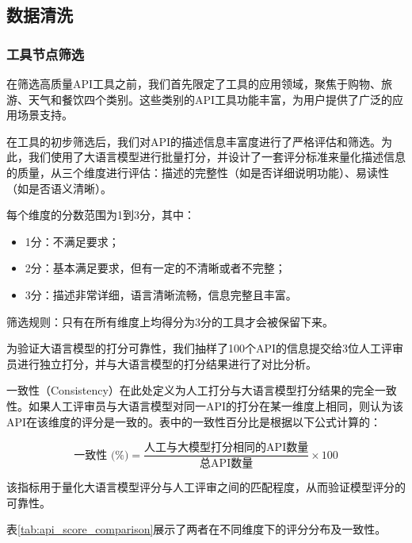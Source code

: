 \subsection{数据清洗}

\subsubsection{工具节点筛选}

在筛选高质量API工具之前，我们首先限定了工具的应用领域，聚焦于购物、旅游、天气和餐饮四个类别。这些类别的API工具功能丰富，为用户提供了广泛的应用场景支持。

在工具的初步筛选后，我们对API的描述信息丰富度进行了严格评估和筛选。为此，我们使用了大语言模型进行批量打分，并设计了一套评分标准来量化描述信息的质量，从三个维度进行评估：描述的完整性（如是否详细说明功能）、易读性（如是否语义清晰）。

每个维度的分数范围为1到3分，其中：
\begin{itemize}
    \item 1分：不满足要求；
    \item 2分：基本满足要求，但有一定的不清晰或者不完整；
    \item 3分：描述非常详细，语言清晰流畅，信息完整且丰富。
\end{itemize}

筛选规则：只有在所有维度上均得分为3分的工具才会被保留下来。

为验证大语言模型的打分可靠性，我们抽样了100个API的信息提交给3位人工评审员进行独立打分，并与大语言模型的打分结果进行了对比分析。

一致性（Consistency）在此处定义为人工打分与大语言模型打分结果的完全一致性。如果人工评审员与大语言模型对同一API的打分在某一维度上相同，则认为该API在该维度的评分是一致的。表中的一致性百分比是根据以下公式计算的：

\[
\text{一致性 (\%)} = \frac{\text{人工与大模型打分相同的API数量}}{\text{总API数量}} \times 100
\]

该指标用于量化大语言模型评分与人工评审之间的匹配程度，从而验证模型评分的可靠性。

表\ref{tab:api_score_comparison}展示了两者在不同维度下的评分分布及一致性。

